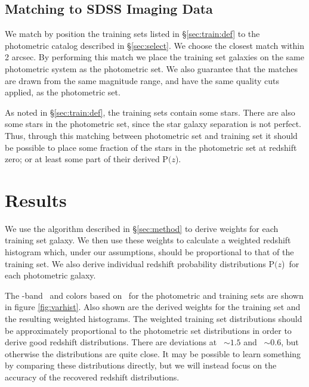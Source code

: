 \documentclass{emulateapj}
\newcommand{\pofz}{P$(z$)}
\newcommand{\matchrad}{2 arcsec}
\begin{document}
\subsection{Matching to SDSS Imaging Data} \label{sec:train:match}

We match by position the training sets listed in \S \ref{sec:train:def} to the
photometric catalog described in \S \ref{sec:select}.  We choose the closest
match within \matchrad.  By performing this match we place the training set
galaxies on the same photometric system as the photometric set.  We also
guarantee that the matches are drawn from the same magnitude range, and
have the same quality cuts applied, as the photometric set.

As noted in \S \ref{sec:train:def}, the training sets contain some stars.
There are also some stars in the photometric set, since the star galaxy
separation is not perfect.  Thus, through this matching between photometric set
and training set it should be possible to place some fraction of the stars in
the photometric set at redshift zero; or at least some part of their derived
\pofz.

\section{Results}

We use the algorithm described in \S \ref{sec:method} to derive weights for
each training set galaxy.  We then use these weights to calculate a weighted
redshift histogram which, under our assumptions, should be proportional to that
of the training set.  We also derive individual redshift probability
distributions \pofz\ for each photometric galaxy.

The \rmag-band \cmodelmag\ and colors based on \modelmag\ for the photometric
and training sets are shown in figure \ref{fig:varhist}.  Also shown are the
derived weights for the training set and the resulting weighted histograms.
The weighted training set distributions should be approximately proportional to
the photometric set distributions in order to derive good redshift
distributions.  There are deviations at \gmr\ $\sim 1.5$ and \rmi\ $\sim 0.6$,
but otherwise the distributions are quite close.  It may be possible to learn
something by comparing these distributions directly, but we will instead focus
on the accuracy of the recovered redshift distributions.
\end{document}
